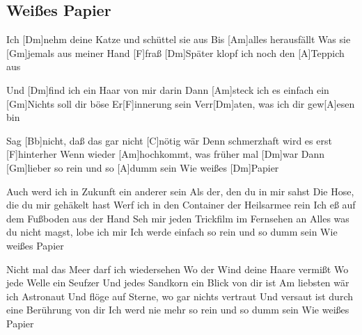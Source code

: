 \subsection*{Weißes Papier   }
\begin{guitar}

Ich [Dm]nehm deine Katze und schüttel sie aus
Bis [Am]alles herausfällt
Was sie [Gm]jemals aus meiner Hand [F]fraß
[Dm]Später klopf ich noch den [A]Teppich aus

Und [Dm]find ich ein Haar von mir darin
Dann [Am]steck ich es einfach ein
[Gm]Nichts soll dir böse Er[F]innerung sein
Verr[Dm]aten, was ich dir gew[A]esen bin

Sag [Bb]nicht, daß das gar nicht [C]nötig wär
Denn schmerzhaft wird es erst [F]hinterher
Wenn wieder [Am]hochkommt, was früher mal [Dm]war
Dann [Gm]lieber so rein und so [A]dumm sein
Wie weißes [Dm]Papier


Auch werd ich in Zukunft ein anderer sein
Als der, den du in mir sahst
Die Hose, die du mir gehäkelt hast
Werf ich in den Container der Heilsarmee rein
Ich eß auf dem Fußboden aus der Hand
Seh mir jeden Trickfilm im Fernsehen an
Alles was du nicht magst, lobe ich mir
Ich werde einfach so rein und so dumm sein
Wie weißes Papier



Nicht mal das Meer darf ich wiedersehen
Wo der Wind deine Haare vermißt
Wo jede Welle ein Seufzer
Und jedes Sandkorn ein Blick von dir ist
Am liebsten wär ich Astronaut
Und flöge auf Sterne, wo gar nichts vertraut
Und versaut ist durch eine Berührung von dir
Ich werd nie mehr so rein und so dumm sein
Wie weißes Papier

\end{guitar}
